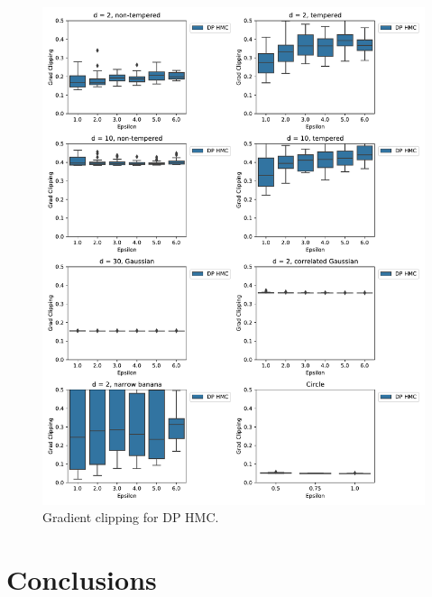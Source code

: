 \documentclass[english,twoside,openright]{HYgraduMLDS}
\begin{document}
\begin{figure}
  \centering
  \includegraphics[width=\textwidth]{figures/grad_clipping}
  \caption{
    Gradient clipping for DP HMC.
  }
  \label{grad_clipping_fig}
\end{figure}

\chapter{Conclusions}

\cleardoublepage %


\end{document}
